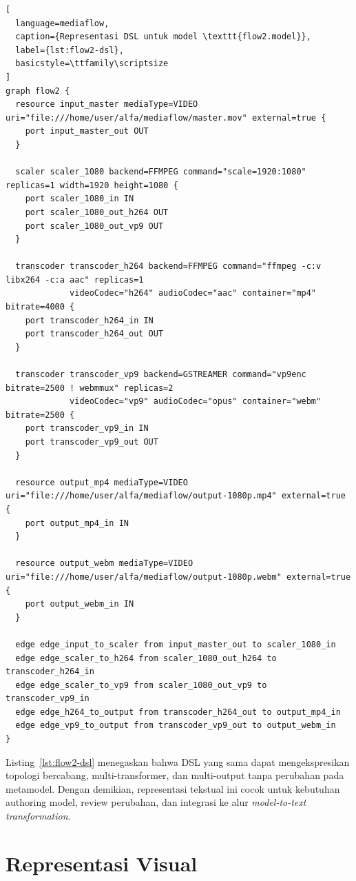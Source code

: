 \begin{lstlisting}[
  language=mediaflow,
  caption={Representasi DSL untuk model \texttt{flow2.model}},
  label={lst:flow2-dsl},
  basicstyle=\ttfamily\scriptsize
]
graph flow2 {
  resource input_master mediaType=VIDEO uri="file:///home/user/alfa/mediaflow/master.mov" external=true {
    port input_master_out OUT
  }

  scaler scaler_1080 backend=FFMPEG command="scale=1920:1080" replicas=1 width=1920 height=1080 {
    port scaler_1080_in IN
    port scaler_1080_out_h264 OUT
    port scaler_1080_out_vp9 OUT
  }

  transcoder transcoder_h264 backend=FFMPEG command="ffmpeg -c:v libx264 -c:a aac" replicas=1
             videoCodec="h264" audioCodec="aac" container="mp4" bitrate=4000 {
    port transcoder_h264_in IN
    port transcoder_h264_out OUT
  }

  transcoder transcoder_vp9 backend=GSTREAMER command="vp9enc bitrate=2500 ! webmmux" replicas=2
             videoCodec="vp9" audioCodec="opus" container="webm" bitrate=2500 {
    port transcoder_vp9_in IN
    port transcoder_vp9_out OUT
  }

  resource output_mp4 mediaType=VIDEO uri="file:///home/user/alfa/mediaflow/output-1080p.mp4" external=true {
    port output_mp4_in IN
  }

  resource output_webm mediaType=VIDEO uri="file:///home/user/alfa/mediaflow/output-1080p.webm" external=true {
    port output_webm_in IN
  }

  edge edge_input_to_scaler from input_master_out to scaler_1080_in
  edge edge_scaler_to_h264 from scaler_1080_out_h264 to transcoder_h264_in
  edge edge_scaler_to_vp9 from scaler_1080_out_vp9 to transcoder_vp9_in
  edge edge_h264_to_output from transcoder_h264_out to output_mp4_in
  edge edge_vp9_to_output from transcoder_vp9_out to output_webm_in
}
\end{lstlisting}

Listing~\ref{lst:flow2-dsl} menegaskan bahwa DSL yang sama dapat mengekspresikan topologi bercabang, multi-transformer, dan multi-output tanpa perubahan pada metamodel. Dengan demikian, representasi tekstual ini cocok untuk kebutuhan authoring model, review perubahan, dan integrasi ke alur \textit{model-to-text transformation}.

\section{Representasi Visual}
\label{sec:representasi-visual}

